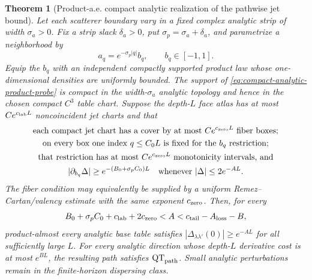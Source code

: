 \documentclass[11pt]{article}
\newtheorem{theorem}{Theorem}[section]
\begin{document}
\begin{theorem}[Product-a.e. compact analytic realization of the pathwise jet bound]
\label{thm:analytic-QT-realization}
Let each scatterer boundary vary in a fixed complex analytic strip of width
$\sigma_a>0$.  Fix a strip slack $\delta_a>0$, put
$\sigma_p=\sigma_a+\delta_a$, and parametrize a neighborhood by
\begin{equation}
\label{eq:compact-analytic-product-probe}
 a_q=e^{-\sigma_p|q|}b_q,\qquad b_q\in[-1,1].
\end{equation}
Equip the $b_q$ with an independent compactly supported product law whose
one-dimensional densities are uniformly bounded.  The support of
\eqref{eq:compact-analytic-product-probe} is compact in the width-$\sigma_a$
analytic topology and hence in the chosen compact $C^3$ table chart.  Suppose
the depth-$L$ face atlas has at most $Ce^{c_{\rm lab}L}$ noncoincident jet
charts and that
\begin{equation}
\label{eq:localized-analytic-jet-direction}
 \begin{gathered}
 \text{each compact jet chart has a cover by at most }
 Ce^{c_{\rm zero}L}\text{ fiber boxes;}\\
 \text{on every box one index }q\le C_0L\text{ is fixed for the }b_q
 \text{ restriction;}\\
 \text{that restriction has at most }Ce^{c_{\rm zero}L}
 \text{ monotonicity intervals, and}\\
 |\partial_{b_q}\Delta|\ge
 e^{-(B_0+\sigma_pC_0)L}
 \quad\text{whenever }|\Delta|\le2e^{-AL}.
 \end{gathered}
\end{equation}
The fiber condition may equivalently be supplied by a uniform
Remez--Cartan/valency estimate with the same exponent $c_{\rm zero}$.  Then,
for every
\begin{equation}
\label{eq:analytic-QT-window}
 B_0+\sigma_pC_0+c_{\rm lab}+2c_{\rm zero}
 <A<c_{\rm tail}-A_{\rm loss}-B,
\end{equation}
product-almost every analytic base table satisfies
$|\Delta_{\lambda\lambda'}(0)|\ge e^{-AL}$ for all sufficiently large $L$.
For every analytic direction whose depth-$L$ derivative cost is at most
$e^{BL}$, the resulting path satisfies $\mathrm{QT}_{\rm path}$.  Small
analytic perturbations remain in the finite-horizon dispersing class.


\end{theorem}
\end{document}
